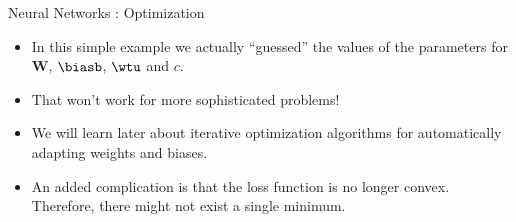 \documentclass[11pt,compress,t,notes=noshow, xcolor=table]{beamer}
\begin{document}
\begin{frame} {Neural Networks : Optimization}
  \begin{itemize}
    \item In this simple example we actually \enquote{guessed} the values of the parameters for $\textbf{W}$, $\biasb$, $\wtu$ and $c$.
    \vspace{3mm}
    \item That won't work for more sophisticated problems!
    \vspace{3mm}
    \item We will learn later about iterative optimization algorithms for automatically adapting weights and biases.
    \vspace{3mm}
    \item An added complication is that the loss function is no longer convex. Therefore, there might not exist a single minimum. 
  \end{itemize}
\end{frame}

\endlecture
\end{document}
